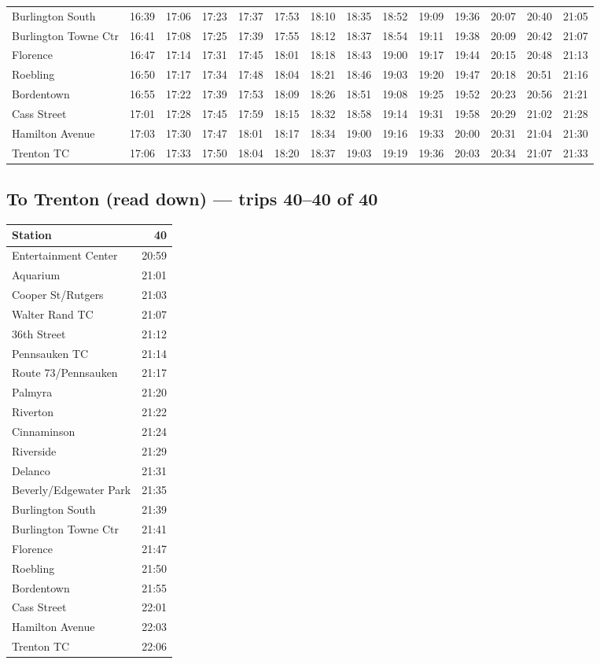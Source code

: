 \begin{center}
\begin{tabular}{@{}lrrrrrrrrrrrrr@{}}
Burlington South & 16:39 & 17:06 & 17:23 & 17:37 & 17:53 & 18:10 & 18:35 & 18:52 & 19:09 & 19:36 & 20:07 & 20:40 & 21:05 \\
Burlington Towne Ctr & 16:41 & 17:08 & 17:25 & 17:39 & 17:55 & 18:12 & 18:37 & 18:54 & 19:11 & 19:38 & 20:09 & 20:42 & 21:07 \\
Florence & 16:47 & 17:14 & 17:31 & 17:45 & 18:01 & 18:18 & 18:43 & 19:00 & 19:17 & 19:44 & 20:15 & 20:48 & 21:13 \\
Roebling & 16:50 & 17:17 & 17:34 & 17:48 & 18:04 & 18:21 & 18:46 & 19:03 & 19:20 & 19:47 & 20:18 & 20:51 & 21:16 \\
Bordentown & 16:55 & 17:22 & 17:39 & 17:53 & 18:09 & 18:26 & 18:51 & 19:08 & 19:25 & 19:52 & 20:23 & 20:56 & 21:21 \\
Cass Street & 17:01 & 17:28 & 17:45 & 17:59 & 18:15 & 18:32 & 18:58 & 19:14 & 19:31 & 19:58 & 20:29 & 21:02 & 21:28 \\
Hamilton Avenue & 17:03 & 17:30 & 17:47 & 18:01 & 18:17 & 18:34 & 19:00 & 19:16 & 19:33 & 20:00 & 20:31 & 21:04 & 21:30 \\
Trenton TC & 17:06 & 17:33 & 17:50 & 18:04 & 18:20 & 18:37 & 19:03 & 19:19 & 19:36 & 20:03 & 20:34 & 21:07 & 21:33 \\
\bottomrule\end{tabular}\end{center}
\subsection*{To Trenton (read down) --- trips 40--40 of 40}
\begin{center}\footnotesize\setlength{\tabcolsep}{3pt}\begin{tabular}{@{}lr@{}}\toprule
Station & 40 \\\midrule
Entertainment Center & 20:59 \\
Aquarium & 21:01 \\
Cooper St/Rutgers & 21:03 \\
Walter Rand TC & 21:07 \\
36th Street & 21:12 \\
Pennsauken TC & 21:14 \\
Route 73/Pennsauken & 21:17 \\
Palmyra & 21:20 \\
Riverton & 21:22 \\
Cinnaminson & 21:24 \\
Riverside & 21:29 \\
Delanco & 21:31 \\
Beverly/Edgewater Park & 21:35 \\
Burlington South & 21:39 \\
Burlington Towne Ctr & 21:41 \\
Florence & 21:47 \\
Roebling & 21:50 \\
Bordentown & 21:55 \\
Cass Street & 22:01 \\
Hamilton Avenue & 22:03 \\
Trenton TC & 22:06 \\
\bottomrule\end{tabular}\end{center}
